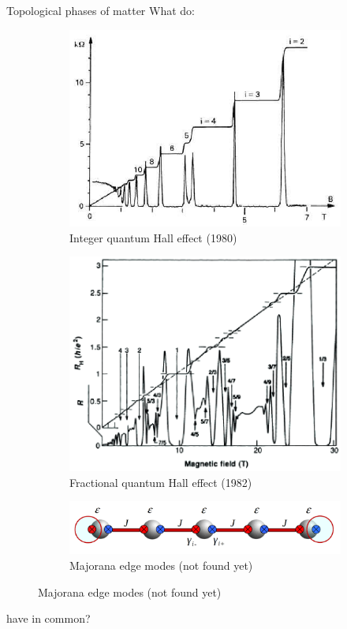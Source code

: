 \documentclass{beamer}
\begin{document}
\setcounter{framenumber}{0}
\begin{frame}{Topological phases of matter}
	What do:
	\begin{figure}
		\centering
		\begin{subfigure}[b]{0.3\textwidth}
			\centering
			\includegraphics[width=\textwidth]{Figures/IntegerQHE.png}
			\caption{Integer quantum Hall effect (1980)}
		\end{subfigure}
		\hfill
		\begin{subfigure}[b]{0.3\textwidth}
			\centering
			\includegraphics[width=\textwidth]{Figures/FractionalQHE.png}
			\caption{Fractional quantum Hall effect (1982)}
		\end{subfigure}
		\hfill
		\begin{subfigure}[b]{0.3\textwidth}
			\centering
			\includegraphics[width=\textwidth]{Figures/MajoranaEdgeModes.png}
			\caption{Majorana edge modes (not found yet)}
		\end{subfigure}
	\end{figure}
	have in common?
\end{frame}
\end{document}
